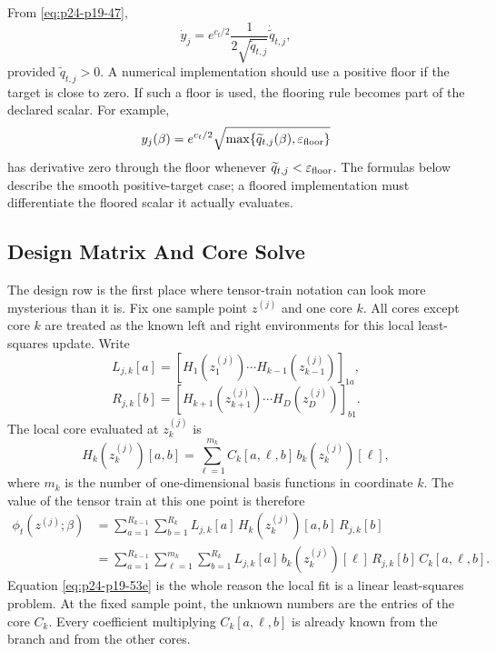 \documentclass[11pt]{article}
\begin{document}
From \eqref{eq:p24-p19-47},
\[
    \dot y_j
    =
    e^{c_t/2}
    \frac{1}{2\sqrt{\widetilde q_{t,j}}}
    \dot{\widetilde q}_{t,j},
    \label{eq:p24-p19-53}
\]
provided \(\widetilde q_{t,j}>0\).  A numerical implementation should use a
positive floor if the target is close to zero.  If such a floor is used, the
flooring rule becomes part of the declared scalar.  For example,
\[
    y_j(\beta)
    =
    e^{c_t/2}\sqrt{\max\{\widetilde q_{t,j}(\beta),\varepsilon_{\rm floor}\}}
    \label{eq:p24-p19-53a}
\]
has derivative zero through the floor whenever
\(\widetilde q_{t,j}<\varepsilon_{\rm floor}\).  The formulas below describe
the smooth positive-target case; a floored implementation must differentiate
the floored scalar it actually evaluates.

\subsection{Design Matrix And Core Solve}

The design row is the first place where tensor-train notation can look more
mysterious than it is.  Fix one sample point \(z^{(j)}\) and one core \(k\).
All cores except core \(k\) are treated as the known left and right
environments for this local least-squares update.  Write
\[
    L_{j,k}[a]
    =
    \left[
    H_{1}(z_1^{(j)})\cdots H_{k-1}(z_{k-1}^{(j)})
    \right]_{1a},
    \label{eq:p24-p19-53b}
\]
\[
    R_{j,k}[b]
    =
    \left[
    H_{k+1}(z_{k+1}^{(j)})\cdots H_D(z_D^{(j)})
    \right]_{b1}.
    \label{eq:p24-p19-53c}
\]
The local core evaluated at \(z_k^{(j)}\) is
\[
    H_k(z_k^{(j)})[a,b]
    =
    \sum_{\ell=1}^{m_k}
    C_k[a,\ell,b]\,b_k(z_k^{(j)})[\ell],
    \label{eq:p24-p19-53d}
\]
where \(m_k\) is the number of one-dimensional basis functions in coordinate
\(k\).  The value of the tensor train at this one point is therefore
\[
\begin{aligned}
    \phi_t(z^{(j)};\beta)
    &=
    \sum_{a=1}^{R_{k-1}}
    \sum_{b=1}^{R_k}
    L_{j,k}[a]\,H_k(z_k^{(j)})[a,b]\,R_{j,k}[b]\\
    &=
    \sum_{a=1}^{R_{k-1}}
    \sum_{\ell=1}^{m_k}
    \sum_{b=1}^{R_k}
    L_{j,k}[a]\,
    b_k(z_k^{(j)})[\ell]\,
    R_{j,k}[b]\,
    C_k[a,\ell,b].
\end{aligned}
    \label{eq:p24-p19-53e}
\]
Equation \eqref{eq:p24-p19-53e} is the whole reason the local fit is a linear least-squares
problem.  At the fixed sample point, the unknown numbers are the entries of
the core \(C_k\).  Every coefficient multiplying \(C_k[a,\ell,b]\) is already
known from the branch and from the other cores.
\end{document}
